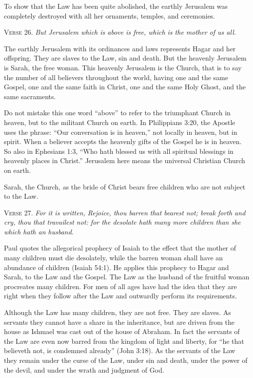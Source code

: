 To show that the Law has been quite abolished, the earthly Jerusalem was completely destroyed with all her ornaments, temples, and ceremonies.

\textsc{Verse} 26. \emph{But Jerusalem which is above is free, which is the mother of us all.}

The earthly Jerusalem with its ordinances and laws represents Hagar and her offspring. They are slaves to the Law, sin and death. But the heavenly Jerusalem is Sarah, the free woman. This heavenly Jerusalem is the Church, that is to say the number of all believers throughout the world, having one and the same Gospel, one and the same faith in Christ, one and the same Holy Ghost, and the same sacraments.

Do not mistake this one word “above” to refer to the triumphant Church in heaven, but to the militant Church on earth. In Philippians 3:20, the Apostle uses the phrase: “Our conversation is in heaven,” not locally in heaven, but in spirit. When a believer accepts the heavenly gifts of the Gospel he is in heaven. So also in Ephesians 1:3, “Who hath blessed us with all spiritual blessings in heavenly places in Christ.” Jerusalem here means the universal Christian Church on earth.

Sarah, the Church, as the bride of Christ bears free children who are not subject to the Law.

\textsc{Verse} 27. \emph{For it is written, Rejoice, thou barren that bearest not; break forth and cry, thou that travailest not: for the desolate hath many more children than she which hath an husband.}

Paul quotes the allegorical prophecy of Isaiah to the effect that the mother of many children must die desolately, while the barren woman shall have an abundance of children (Isaiah 54:1). He applies this prophecy to Hagar and Sarah, to the Law and the Gospel. The Law as the husband of the fruitful woman procreates many children. For men of all ages have had the idea that they are right when they follow after the Law and outwardly perform its requirements.

Although the Law has many children, they are not free. They are slaves. As servants they cannot have a share in the inheritance, but are driven from the house as Ishmael was cast out of the house of Abraham. In fact the servants of the Law are even now barred from the kingdom of light and liberty, for “he that believeth not, is condemned already” (John 3:18). As the servants of the Law they remain under the curse of the Law, under sin and death, under the power of the devil, and under the wrath and judgment of God.

